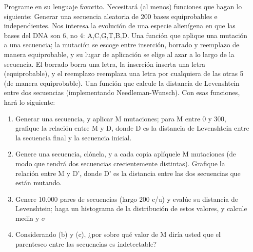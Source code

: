 Programe en su lenguaje favorito. Necesitará (al menos) funciones que hagan lo siguiente:
Generar una secuencia aleatoria de 200 bases equiprobables e independientes. Nos interesa la
evolución de una especie alienígena en que las bases del DNA son 6, no 4: {A,C,G,T,B,D}.
Una función que aplique una mutación a una secuencia; la mutación se escoge entre inserción,
borrado y reemplazo de manera equiprobable, y su lugar de aplicación se elige al azar a lo largo
de la secuencia. El borrado borra una letra, la inserción inserta una letra (equiprobable), y el
reemplazo reemplaza una letra por cualquiera de las otras 5 (de manera equiprobable).
Una función que calcule la distancia de Levenshtein entre dos secuencias (implementando
Needleman-Wunsch).
Con esas funciones, hará lo siguiente:

\begin{enumerate}

\item Generar una secuencia, y aplicar M mutaciones; para M entre 0 y 300, grafique la relación
entre M y D, donde D es la distancia de Levenshtein entre la secuencia final y la secuencia
inicial.


\item Genere una secuencia, clónela, y a cada copia aplíquele M mutaciones (de modo que tendrá
dos secuencias crecientemente distintas). Grafique la relación entre M y D’, donde D’ es la
distancia entre las dos secuencias que están mutando.


\item Genere 10.000 pares de secuencias (largo 200 c/u) y evalúe su distancia de Levenshtein; haga
un histograma de la distribución de estos valores, y calcule media y $\sigma$


\item Considerando (b) y (c), ¿por sobre qué valor de M diría usted que el parentesco entre las
secuencias es indetectable?


\end{enumerate}
